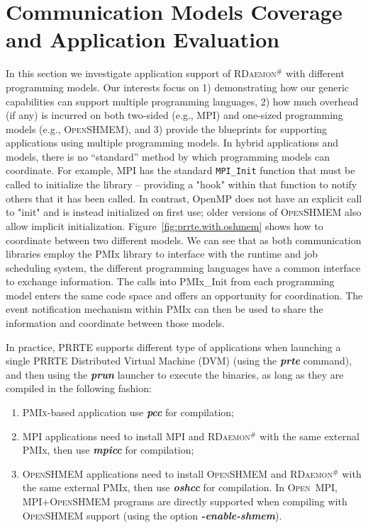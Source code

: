 \documentclass[5p,times,twocolumn]{elsarticle}
\newcommand{\mpifunc}[1]{\lstinline"MPI_#1"\xspace}
\newcommand{\prrte}[0]{\textsc{PRRTE}\xspace}
\newcommand{\pmix}[0]{\textsc{PMIx}\xspace}
\newcommand{\ompi}[0]{\textsc{Open~MPI}\xspace}
\newcommand{\mpi}[0]{\textsc{MPI}\xspace}
\newcommand{\oshmem}[0]{\textsc{OpenSHMEM}\xspace}
\newcommand{\ourwork}[0]{\textsc{RDaemon}\ensuremath{^\#}\xspace}
\begin{document}
\section{Communication Models Coverage and Application Evaluation}\label{sec:application}
In this section we investigate application support of \ourwork with different programming models.
Our interests focus on 1) demonstrating how our generic capabilities can support multiple programming languages, 2) how much overhead (if any) is incurred on both two-sided (e.g., \mpi) and one-sized programming models (e.g., \oshmem), and 3) provide the blueprints for supporting applications using multiple programming models.
In hybrid applications and models, there is no ``standard'' method by which programming models can coordinate.
For example, \mpi has the standard \mpifunc{Init} function that must be called to initialize the
library – providing a "hook" within that function to notify others that it has been called.
In contrast, OpenMP does not have an explicit call to "init" and is instead initialized on first use; older versions of \oshmem also allow implicit initialization.
Figure~\ref{fig:prrte.with.oshmem} shows how to coordinate between two different models. We can see
that as both communication libraries employ the PMIx library to interface with the runtime and job scheduling system,
the different programming languages have a common interface to exchange information.
The calls into PMIx\_Init from each programming model enters the same code space and offers an opportunity for coordination.
The event notification mechanism within PMIx can then be used to share the information and coordinate between those models.

In practice, \prrte supports different type of applications when launching a single \prrte Distributed Virtual Machine (DVM) (using the \textbf{\emph{prte}} command), and then using the \textbf{\emph{prun}} launcher to execute the binaries, as long as they are compiled in the following fashion:
\begin{enumerate}
  \item \pmix-based application use \textbf{\emph{pcc}} for compilation;
  \item \mpi applications need to install \mpi and \ourwork with the same external PMIx, then use \textbf{\emph{mpicc}} for compilation;
  \item \oshmem applications need to install \oshmem and \ourwork with the same external PMIx, then use \textbf{\emph{oshcc}} for compilation. In \ompi, \mpi+\oshmem programs are directly supported when compiling with \oshmem support (using the option \textbf{\emph{-enable-shmem}}).
\end{enumerate}
\end{document}

